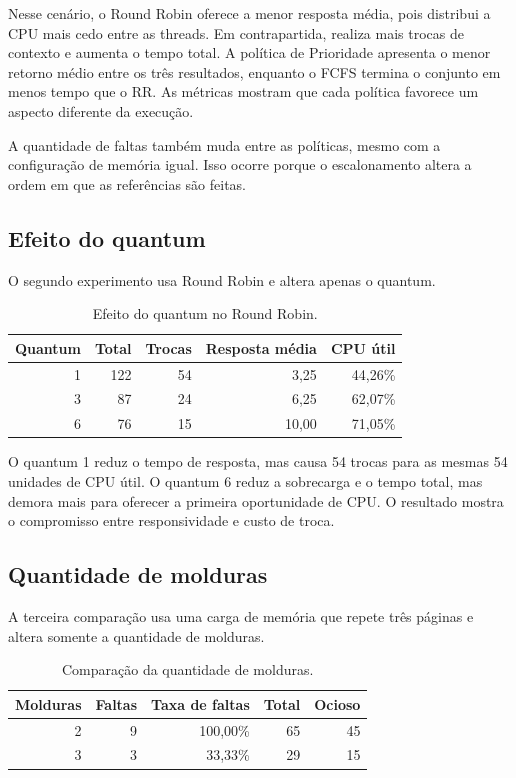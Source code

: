 \documentclass[11pt,a4paper]{article}
\begin{document}
Nesse cenário, o Round Robin oferece a menor resposta média, pois distribui a CPU mais cedo entre as threads. Em contrapartida, realiza mais trocas de contexto e aumenta o tempo total. A política de Prioridade apresenta o menor retorno médio entre os três resultados, enquanto o FCFS termina o conjunto em menos tempo que o RR. As métricas mostram que cada política favorece um aspecto diferente da execução.

A quantidade de faltas também muda entre as políticas, mesmo com a configuração de memória igual. Isso ocorre porque o escalonamento altera a ordem em que as referências são feitas.

\subsection{Efeito do quantum}

O segundo experimento usa Round Robin e altera apenas o quantum.

\begin{table}[H]
\centering
\small
\begin{tabular}{rrrrr}
\toprule
Quantum & Total & Trocas & Resposta média & CPU útil\\
\midrule
1 & 122 & 54 & 3,25 & 44,26\%\\
3 & 87 & 24 & 6,25 & 62,07\%\\
6 & 76 & 15 & 10,00 & 71,05\%\\
\bottomrule
\end{tabular}
\caption{Efeito do quantum no Round Robin.}
\end{table}

O quantum 1 reduz o tempo de resposta, mas causa 54 trocas para as mesmas 54 unidades de CPU útil. O quantum 6 reduz a sobrecarga e o tempo total, mas demora mais para oferecer a primeira oportunidade de CPU. O resultado mostra o compromisso entre responsividade e custo de troca.

\subsection{Quantidade de molduras}

A terceira comparação usa uma carga de memória que repete três páginas e altera somente a quantidade de molduras.

\begin{table}[H]
\centering
\small
\begin{tabular}{rrrrr}
\toprule
Molduras & Faltas & Taxa de faltas & Total & Ocioso\\
\midrule
2 & 9 & 100,00\% & 65 & 45\\
3 & 3 & 33,33\% & 29 & 15\\
\bottomrule
\end{tabular}
\caption{Comparação da quantidade de molduras.}
\end{table}
\end{document}
